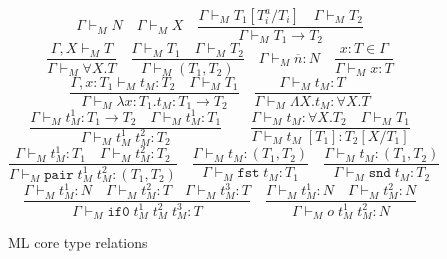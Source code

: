 \begin{figure}
\[
\Gamma\vdash_{M}N
\quad
\Gamma\vdash_{M}X
\quad
\frac{\Gamma\vdash_{M}T_{1}[T^{a}_{i}/T_{i}]\quad\Gamma\vdash_{M}T_{2}}{\Gamma\vdash_{M}T_{1}\rightarrow T_{2}}
\]
\[
\frac{\Gamma ,X\vdash_{M}T}{\Gamma\vdash_{M}\forall X.T}
\quad
\frac{\Gamma\vdash_{M}T_{1}\quad\Gamma\vdash_{M}T_{2}}{\Gamma\vdash_{M}(T_{1},T_{2})}
\quad
\Gamma\vdash_{M}\overline{n}:N
\quad
\frac{x:T\in\Gamma}{\Gamma\vdash_{M}x:T}
\]
\[
\frac{\Gamma,x:T_{1}\vdash_{M}t_{M}:T_{2}\quad\Gamma\vdash_{M}T_{1}}{\Gamma\vdash_{M}\lambda x:T_{1}.t_{M}:T_{1}\rightarrow T_{2}}
\quad
\frac{\Gamma\vdash_{M}t_{M}:T}{\Gamma\vdash_{M}\Lambda X.t_{M}:\forall X.T}
\]
\[
\frac{\Gamma\vdash_{M}t_{M}^{1}:T_{1}\rightarrow T_{2}\quad\Gamma\vdash_{M}t_{M}^{1}:T_{1}}{\Gamma\vdash_{M}t_{M}^{1}\;t_{M}^{2}:T_{2}}
\quad
\quad
\frac{\Gamma\vdash_{M}t_{M}:\forall X.T_{2}\quad\Gamma\vdash_{M}T_{1}}{\Gamma\vdash_{M}t_{M}\;[T_{1}]:T_{2}[X/T_{1}]}
\]
\[
\frac{\Gamma\vdash_{M}t_{M}^{1}:T_{1}\quad\Gamma\vdash_{M}t_{M}^{2}:T_{2}}{\Gamma\vdash_{M}\mathtt{pair}\;t_{M}^{1}\;t_{M}^{2}:(T_{1},T_{2})}
\quad
\frac{\Gamma\vdash_{M}t_{M}:(T_{1},T_{2})}{\Gamma\vdash_{M}\mathtt{fst}\;t_{M}:T_{1}}
\quad
\frac{\Gamma\vdash_{M}t_{M}:(T_{1},T_{2})}{\Gamma\vdash_{M}\mathtt{snd}\;t_{M}:T_{2}}
\]
\[
\frac{\Gamma\vdash_{M}t_{M}^{1}:N\quad\Gamma\vdash_{M}t_{M}^{2}:T\quad\Gamma\vdash_{M}t_{M}^{3}:T}{\Gamma\vdash_{M}\mathtt{if0}\;t_{M}^{1}\;t_{M}^{2}\;t_{M}^{3}:T}
\quad
\frac{\Gamma\vdash_{M}t_{M}^{1}:N\quad\Gamma\vdash_{M}t_{M}^{2}:N}{\Gamma\vdash_{M}o\;t_{M}^{1}\;t_{M}^{2}:N}
\]
\caption{ML core type relations}
\label{mctr}
\end{figure}